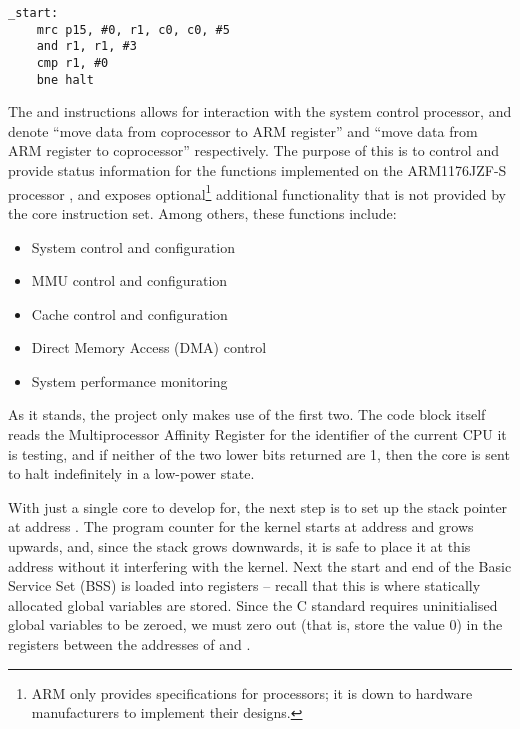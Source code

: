         \lstset{style=asm}
        \begin{lstlisting}[caption={Code to halt three of the four cores},captionpos=b]
_start:
    mrc p15, #0, r1, c0, c0, #5
    and r1, r1, #3
    cmp r1, #0
    bne halt
        \end{lstlisting}

        The  and  instructions allows for interaction with
        the system control processor, and denote ``move data from coprocessor to
        ARM register'' and ``move data from ARM register to coprocessor''
        respectively. The purpose of this is to control and provide status
        information for the functions implemented on the ARM1176JZF-S processor
        \cite[pg.~3-2]{TRM}, and exposes optional\footnote{ARM only provides
        specifications for processors; it is down to hardware manufacturers to
        implement their designs.} additional functionality that is not provided
        by the core instruction set. Among others, these functions include:
        \begin{itemize}
            \itemsep0em
            \item System control and configuration
            \item MMU control and configuration
            \item Cache control and configuration
            \item Direct Memory Access (DMA) control
            \item System performance monitoring
        \end{itemize}

        As it stands, the project only makes use of the first two. The code
        block itself reads the Multiprocessor Affinity Register \cite{MPIDR} for
        the identifier of the current CPU it is testing, and if neither of the
        two lower bits returned are 1, then the core is sent to halt
        indefinitely in a low-power state.

        With just a single core to develop for, the next step is to set up the
        stack pointer at address . The program counter for the
        kernel starts at address  and grows upwards, and, since the
        stack grows downwards, it is safe to place it at this address without it
        interfering with the kernel. Next the start and end of the Basic Service
        Set (BSS) is loaded into registers -- recall that this is where
        statically allocated global variables are stored. Since the C standard
        requires uninitialised global variables to be zeroed, we must zero out
        (that is, store the value 0) in the registers between the addresses of
         and .

